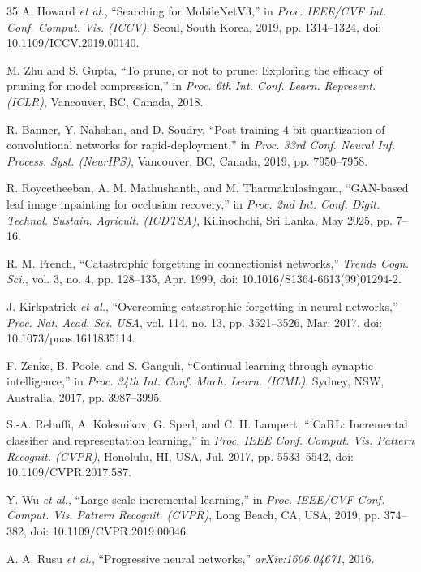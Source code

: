 \documentclass[journal]{IEEEtran}
\begin{document}
\begin{thebibliography}{35}
A. Howard \emph{et al.}, ``Searching for MobileNetV3,'' in \emph{Proc. IEEE/CVF Int.
Conf. Comput. Vis. (ICCV)}, Seoul, South Korea, 2019, pp. 1314--1324,
doi: 10.1109/ICCV.2019.00140.

M. Zhu and S. Gupta, ``To prune, or not to prune: Exploring the efficacy of pruning
for model compression,'' in \emph{Proc. 6th Int. Conf. Learn. Represent. (ICLR)},
Vancouver, BC, Canada, 2018.

R. Banner, Y. Nahshan, and D. Soudry, ``Post training 4-bit quantization of
convolutional networks for rapid-deployment,'' in \emph{Proc. 33rd Conf. Neural Inf.
Process. Syst. (NeurIPS)}, Vancouver, BC, Canada, 2019, pp. 7950--7958.

R. Roycetheeban, A. M. Mathushanth, and M. Tharmakulasingam, ``GAN-based leaf image
inpainting for occlusion recovery,'' in \emph{Proc. 2nd Int. Conf. Digit. Technol.
Sustain. Agricult. (ICDTSA)}, Kilinochchi, Sri Lanka, May 2025, pp. 7--16.

R. M. French, ``Catastrophic forgetting in connectionist networks,'' \emph{Trends
Cogn. Sci.}, vol. 3, no. 4, pp. 128--135, Apr. 1999,
doi: 10.1016/S1364-6613(99)01294-2.

J. Kirkpatrick \emph{et al.}, ``Overcoming catastrophic forgetting in neural
networks,'' \emph{Proc. Nat. Acad. Sci. USA}, vol. 114, no. 13, pp. 3521--3526,
Mar. 2017, doi: 10.1073/pnas.1611835114.

F. Zenke, B. Poole, and S. Ganguli, ``Continual learning through synaptic
intelligence,'' in \emph{Proc. 34th Int. Conf. Mach. Learn. (ICML)}, Sydney, NSW,
Australia, 2017, pp. 3987--3995.

S.-A. Rebuffi, A. Kolesnikov, G. Sperl, and C. H. Lampert, ``iCaRL: Incremental
classifier and representation learning,'' in \emph{Proc. IEEE Conf. Comput. Vis.
Pattern Recognit. (CVPR)}, Honolulu, HI, USA, Jul. 2017, pp. 5533--5542,
doi: 10.1109/CVPR.2017.587.

Y. Wu \emph{et al.}, ``Large scale incremental learning,'' in \emph{Proc. IEEE/CVF
Conf. Comput. Vis. Pattern Recognit. (CVPR)}, Long Beach, CA, USA, 2019,
pp. 374--382, doi: 10.1109/CVPR.2019.00046.

A. A. Rusu \emph{et al.}, ``Progressive neural networks,''
\emph{arXiv:1606.04671}, 2016.


\end{thebibliography}
\end{document}
